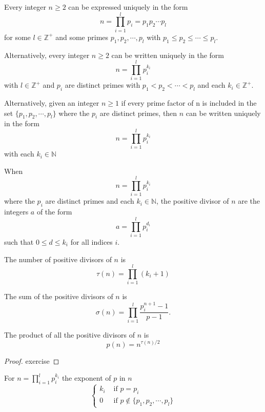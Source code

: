 \begin{thm}
    Every integer $n\geq 2$ can be expressed uniquely in the form \[n=\prod_{i=1}^l p_i = p_1p_2\cdots p_l\] for some $l\in\mathbb{Z}^+$ and some primes $p_1,p_2,\cdots,p_l$ with $p_1\leq p_2\leq \cdots \leq p_l$.
    
    Alternatively, every integer $n\geq 2$ can be written uniquely in the form \[n = \prod_{i=1}^l p_i^{k_i}\] with $l\in\mathbb{Z}^+$ and $p_i$ are distinct primes with $p_1< p_2< \cdots < p_l$ and each $k_i\in\mathbb{Z}^+$.
    
    Alternatively, given an integer $n\geq 1$ if every prime factor of n is included in the set $\{p_1,p_2,\cdots , p_l\}$ where the $p_i$ are distinct primes, then $n$ can be written uniquely in the form \[n = \prod_{i=1}^l p_i^{k_i}\] with each $k_i \in\mathbb{N}$ 
    
    When \[n = \prod_{i=1}^l p_i^{k_i}\] where the $p_i$ are distinct primes and each $k_i \in\mathbb{N}$, the positive divisor of $n$ are the integers $a$ of the form \[a = \prod_{i=1}^l p_i^{d_i}\] such that $0\leq d \leq k_i$ for all indices $i$. 
    
\end{thm}

\begin{thm}
    The number of positive divisors of $n$ is \[\tau (n) = \prod_{i=1}^l (k_i + 1)\]
    
    The sum of the positive divisors of $n$ is \[\sigma (n) = \prod_{i=1}^l 
    \frac{p_i^{n+1}-1}{p-1}.\]
\end{thm} 

\begin{thm}
    The product of all the positive divisors of $n$ is \[p(n) = n^{\tau (n)/2}\]
\end{thm}

\begin{proof} 
    exercise
\end{proof}

\begin{defn}
    For $n = \prod_{i=1}^l p_i^{k_i}$ the exponent of $p$ in $n$
    \begin{equation*}
        \begin{cases}
            k_i & \text{ if } p = p_i\\
            0 & \text{ if } p\not\in\{p_1,p_2,\cdots ,p_l\}
        \end{cases}
    \end{equation*}
\end{defn}

